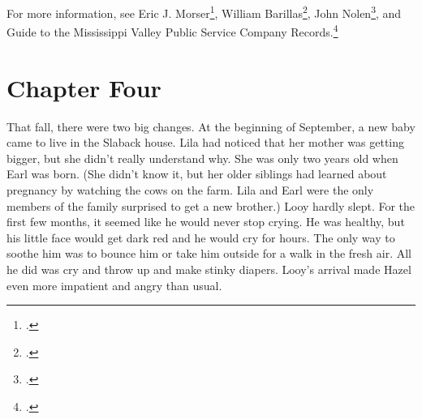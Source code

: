 \documentclass[
  letterpaper,
]{book}
\begin{document}
For more information, see Eric J. Morser\footnote{.},
William Barillas\footnote{.}, John
Nolen\footnote{.},
and Guide to the Mississippi Valley Public Service Company
Records.\footnote{.}


\chapter{Chapter Four}\label{chapter-four}

That fall, there were two big changes. At the beginning of September, a
new baby came to live in the Slaback house. Lila had noticed that her
mother was getting bigger, but she didn't really understand why. She was
only two years old when Earl was born. (She didn't know it, but her
older siblings had learned about pregnancy by watching the cows on the
farm. Lila and Earl were the only members of the family surprised to get
a new brother.) Looy hardly slept. For the first few months, it seemed
like he would never stop crying. He was healthy, but his little face
would get dark red and he would cry for hours. The only way to soothe
him was to bounce him or take him outside for a walk in the fresh air.
All he did was cry and throw up and make stinky diapers. Looy's arrival
made Hazel even more impatient and angry than usual.
\end{document}
